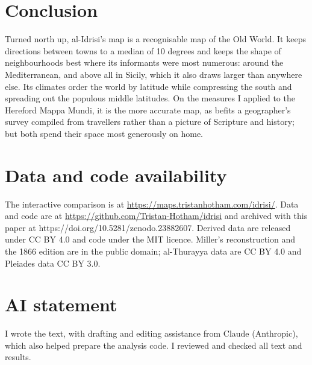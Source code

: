 \documentclass[11pt,a4paper]{article}
\begin{document}
\section{Conclusion}
Turned north up, al-Idrisi's map is a recognisable map of the Old World. It keeps directions between towns to a median of 10 degrees and keeps the shape of neighbourhoods best where its informants were most numerous: around the Mediterranean, and above all in Sicily, which it also draws larger than anywhere else. Its climates order the world by latitude while compressing the south and spreading out the populous middle latitudes. On the measures I applied to the Hereford Mappa Mundi, it is the more accurate map, as befits a geographer's survey compiled from travellers rather than a picture of Scripture and history; but both spend their space most generously on home.

\section*{Data and code availability}
The interactive comparison is at \url{https://maps.tristanhotham.com/idrisi/}. Data and code are at \url{https://github.com/Tristan-Hotham/idrisi} and archived with this paper at https://doi.org/10.5281/zenodo.23882607. Derived data are released under CC BY 4.0 and code under the MIT licence. Miller's reconstruction and the 1866 edition are in the public domain; al-Thurayya data are CC BY 4.0 and Pleiades data CC BY 3.0.

\section*{AI statement}
I wrote the text, with drafting and editing assistance from Claude (Anthropic), which also helped prepare the analysis code. I reviewed and checked all text and results.
\end{document}
